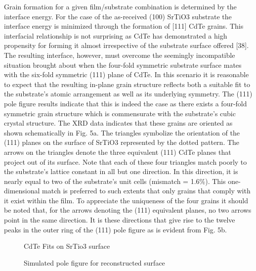 Grain formation for a given film/substrate combination is
determined by the interface energy. For the case of the as-received
(100) SrTiO3 substrate the interface energy is minimized through
the formation of [111] CdTe grains. This interfacial relationship is
not surprising as CdTe has demonstrated a high propensity for
forming it almost irrespective of the substrate surface offered [38].
The resulting interface, however, must overcome the seemingly
incompatible situation brought about when the four-fold symmetric substrate surface mates with the six-fold symmetric (111)
plane of CdTe. In this scenario it is reasonable to expect that the
resulting in-plane grain structure reflects both a suitable fit to the
substrate’s atomic arrangement as well as its underlying symmetry. The (111) pole figure results indicate that this is indeed the
case as there exists a four-fold symmetric grain structure which is
commensurate with the substrate’s cubic crystal structure. The
XRD data indicates that these grains are oriented as shown
schematically in Fig. 5a. The triangles symbolize the orientation of
the (111) planes on the surface of SrTiO3 represented by the
dotted pattern. The arrows on the triangles denote the three
equivalent (111) CdTe planes that project out of its surface. Note
that each of these four triangles match poorly to the substrate’s
lattice constant in all but one direction. In this direction, it is nearly
equal to two of the substrate’s unit cells (mismatch = 1.6\%). This
one-dimensional match is preferred to such extents that only
grains that comply with it exist within the film. To appreciate the
uniqueness of the four grains it should be noted that, for the arrows
denoting the (111) equivalent planes, no two arrows point in the
same direction. It is these directions that give rise to the twelve
peaks in the outer ring of the (111) pole figure as is evident from
Fig. 5b.
\begin{figure}
    \centering
    \caption{\label{fig:srtio3_tri_on_100}CdTe Fits on SrTio3 surface}
\end{figure}
\begin{figure}
    \centering
    \caption{\label{fig:srtio3_sim_polefigure} Simulated pole figure for reconstructed surface}
\end{figure}

